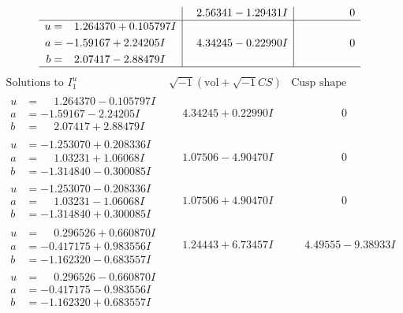\documentclass[1p]{elsarticle_modified}
\theoremstyle{definition}
\newcommand{\I}{\sqrt{-1}}
\begin{document}
$$\begin{array}{c|c|c}
 & \phantom{-}2.56341 - 1.29431 I & \phantom{-0.000000 } 0 \\ \hline\begin{aligned}
u &= \phantom{-}1.264370 + 0.105797 I \\
a &= -1.59167 + 2.24205 I \\
b &= \phantom{-}2.07417 - 2.88479 I\end{aligned}
 & \phantom{-}4.34245 - 0.22990 I & \phantom{-0.000000 } 0\\
 \hline 
 \end{array}$$\newpage$$\begin{array}{c|c|c}  
\text{Solutions to }I^u_{1}& \I (\text{vol} + \sqrt{-1}CS) & \text{Cusp shape}\\
 \hline 
\begin{aligned}
u &= \phantom{-}1.264370 - 0.105797 I \\
a &= -1.59167 - 2.24205 I \\
b &= \phantom{-}2.07417 + 2.88479 I\end{aligned}
 & \phantom{-}4.34245 + 0.22990 I & \phantom{-0.000000 } 0 \\ \hline\begin{aligned}
u &= -1.253070 + 0.208336 I \\
a &= \phantom{-}1.03231 + 1.06068 I \\
b &= -1.314840 - 0.300085 I\end{aligned}
 & \phantom{-}1.07506 - 4.90470 I & \phantom{-0.000000 } 0 \\ \hline\begin{aligned}
u &= -1.253070 - 0.208336 I \\
a &= \phantom{-}1.03231 - 1.06068 I \\
b &= -1.314840 + 0.300085 I\end{aligned}
 & \phantom{-}1.07506 + 4.90470 I & \phantom{-0.000000 } 0 \\ \hline\begin{aligned}
u &= \phantom{-}0.296526 + 0.660870 I \\
a &= -0.417175 + 0.983556 I \\
b &= -1.162320 - 0.683557 I\end{aligned}
 & \phantom{-}1.24443 + 6.73457 I & \phantom{-}4.49555 - 9.38933 I \\ \hline\begin{aligned}
u &= \phantom{-}0.296526 - 0.660870 I \\
a &= -0.417175 - 0.983556 I \\
b &= -1.162320 + 0.683557 I\end{aligned}

\end{array}$$
\end{document}
